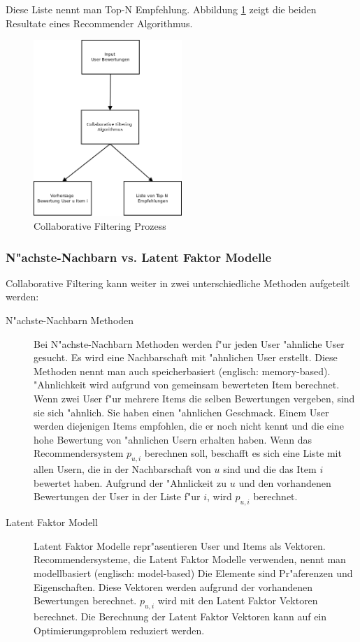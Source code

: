 \documentclass[a4paper, 12pt]{article}
\begin{document}
Diese Liste nennt man Top-N Empfehlung. Abbildung \ref{fig:cfprocess} zeigt die beiden Resultate eines Recommender Algorithmus.

\begin{figure}
  \centering
      \includegraphics[width=0.5\textwidth]{cf}
  \caption{Collaborative Filtering Prozess}
  \label{fig:cfprocess}
\end{figure}

\subsubsection{N"achste-Nachbarn vs. Latent Faktor Modelle}
\label{sec:cfmodels}

Collaborative Filtering kann weiter in zwei unterschiedliche Methoden aufgeteilt werden:

\begin{description}
\item[N"achste-Nachbarn Methoden] Bei N"achste-Nachbarn Methoden werden f"ur jeden User "ahnliche User gesucht. Es wird eine Nachbarschaft mit "ahnlichen User erstellt. Diese Methoden nennt man auch speicherbasiert (englisch: memory-based).
"Ahnlichkeit wird aufgrund von gemeinsam bewerteten Item berechnet. Wenn zwei User f"ur mehrere Items die selben Bewertungen vergeben, sind sie sich "ahnlich. Sie haben einen "ahnlichen Geschmack. Einem User werden diejenigen Items empfohlen, die er noch nicht kennt und die eine hohe Bewertung von "ahnlichen Usern erhalten haben.
Wenn das Recommendersystem $p_{u,i}$ berechnen soll, beschafft es sich eine Liste mit allen Usern, die in der Nachbarschaft von $u$ sind und die das Item $i$ bewertet haben. Aufgrund der "Ahnlickeit zu $u$ und den vorhandenen Bewertungen der User in der Liste f"ur $i$, wird $p_{u,i}$ berechnet.
\item[Latent Faktor Modell] Latent Faktor Modelle repr"asentieren User und Items als Vektoren. Recommendersysteme, die Latent Faktor Modelle verwenden, nennt man modellbasiert (englisch: model-based) Die Elemente sind Pr"aferenzen und Eigenschaften. Diese Vektoren werden aufgrund der vorhandenen Bewertungen berechnet. $p_{u,i}$ wird mit den Latent Faktor Vektoren berechnet. Die Berechnung der Latent Faktor Vektoren kann auf ein Optimierungsproblem reduziert werden.
\end{description}
\end{document}
